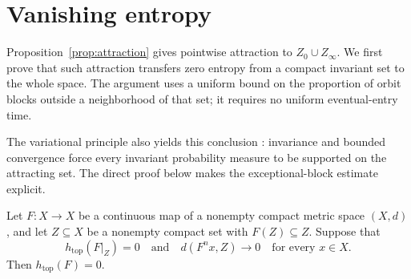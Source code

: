 \section{Vanishing entropy}\label{sec:entropy}

Proposition~\ref{prop:attraction} gives pointwise attraction to
$Z_0\cup Z_\infty$.  We first prove that such attraction transfers zero
entropy from a compact invariant set to the whole space.  The argument
uses a uniform bound on the proportion of orbit blocks outside a
neighborhood of that set; it requires no uniform eventual-entry time.

The variational principle also yields this conclusion
\cite[Section~3]{Misiurewicz1976}: invariance and bounded convergence
force every invariant probability measure to be supported on the
attracting set. The direct proof below makes the exceptional-block
estimate explicit.

\begin{lemma}\label{lemma:localization}
Let $F:X\to X$ be a continuous map of a nonempty compact metric space
$(X,d)$, and let $Z\subseteq X$ be a nonempty compact set with
$F(Z)\subseteq Z$.  Suppose that
\[
  h_{\mathrm{top}}(F|_Z)=0
  \quad\text{and}\quad
  d(F^n x,Z)\longrightarrow 0
  \quad\text{for every }x\in X.
\]
Then $h_{\mathrm{top}}(F)=0$.
\end{lemma}


